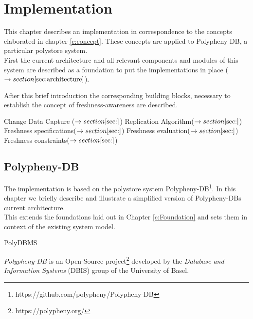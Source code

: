 \chapter{Implementation}
\label{c:implementation}

This chapter describes an implementation in correspondence to the concepts elaborated in chapter \ref{c:concept}. 
These concepts are applied to Polypheny-DB, a particular polystore system.\\
First the current architecture and all relevant components and modules of this system are described as a foundation to put the implementations in place ($\rightarrow section \ref{sec:architecture}$).

After this brief introduction the corresponding building blocks, necessary to establish the concept of freshness-awareness are described.

Change Data Capture ($\rightarrow section \ref{sec:}$)
Replication Algorithm($\rightarrow section \ref{sec:}$)
Freshness specifications($\rightarrow section \ref{sec:}$)
Freshness evaluation($\rightarrow section \ref{sec:}$)
Freshness constraints($\rightarrow section \ref{sec:}$)













\section{Polypheny-DB}
\label{sec:architecture}


The implementation is based on the polystore system Polypheny-DB\footnote{https://github.com/polypheny/Polypheny-DB}.
In this chapter we briefly describe and illustrate a simplified version of Polypheny-DBs current architecture.\\
This extends the foundations laid out in Chapter \ref{c:Foundation} and sets them in context of the existing system model.


PolyDBMS \cite{polypheny2021}

\textit{Polypheny-DB} is an Open-Source project\footnote{https://polypheny.org/} developed by 
the \textit{Database and Information Systems} (DBIS) group of the University of Basel.\\

